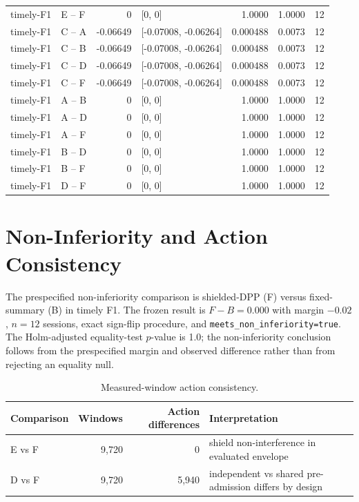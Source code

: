 \documentclass[10pt]{article}
\begin{document}
\begin{longtable}{@{}p{}p{}r p{}rrr@{}}
timely-F1 & E -- F & 0 & [0, 0] & 1.0000 & 1.0000 & 12 \\
timely-F1 & C -- A & -0.06649 & [-0.07008, -0.06264] & 0.000488 & 0.0073 & 12 \\
timely-F1 & C -- B & -0.06649 & [-0.07008, -0.06264] & 0.000488 & 0.0073 & 12 \\
timely-F1 & C -- D & -0.06649 & [-0.07008, -0.06264] & 0.000488 & 0.0073 & 12 \\
timely-F1 & C -- F & -0.06649 & [-0.07008, -0.06264] & 0.000488 & 0.0073 & 12 \\
timely-F1 & A -- B & 0 & [0, 0] & 1.0000 & 1.0000 & 12 \\
timely-F1 & A -- D & 0 & [0, 0] & 1.0000 & 1.0000 & 12 \\
timely-F1 & A -- F & 0 & [0, 0] & 1.0000 & 1.0000 & 12 \\
timely-F1 & B -- D & 0 & [0, 0] & 1.0000 & 1.0000 & 12 \\
timely-F1 & B -- F & 0 & [0, 0] & 1.0000 & 1.0000 & 12 \\
timely-F1 & D -- F & 0 & [0, 0] & 1.0000 & 1.0000 & 12 \\
\end{longtable}

\section{Non-Inferiority and Action Consistency}
The prespecified non-inferiority comparison is shielded-DPP (F) versus fixed-summary (B) in timely F1. The frozen result is $F-B=0.000$ with margin $-0.02$, $n=12$ sessions, exact sign-flip procedure, and \texttt{meets\_non\_inferiority=true}. The Holm-adjusted equality-test $p$-value is 1.0; the non-inferiority conclusion follows from the prespecified margin and observed difference rather than from rejecting an equality null.

\begin{table}[h]
\centering
\caption{Measured-window action consistency.}
\begin{tabular}{@{}lrrl@{}}
\toprule
Comparison & Windows & Action differences & Interpretation\\
\midrule
E vs F & 9,720 & 0 & shield non-interference in evaluated envelope\\
D vs F & 9,720 & 5,940 & independent vs shared pre-admission differs by design\\
\bottomrule
\end{tabular}
\end{table}
\end{document}
